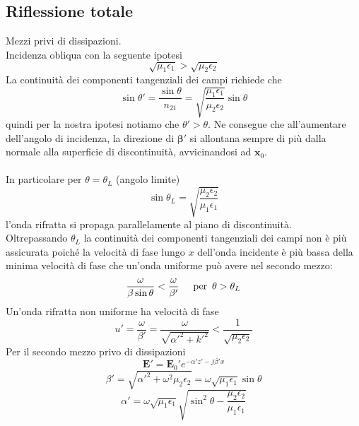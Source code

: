 \documentclass[a4paper]{article}
\begin{document}
\subsection*{Riflessione totale}
Mezzi privi di dissipazioni.\\
Incidenza obliqua con la seguente ipotesi
\begin{equation*}
\sqrt{\mu_1\epsilon_1}>\sqrt{\mu_2\epsilon_2}
\end{equation*}
La continuità dei componenti tangenziali dei campi richiede che
\begin{equation*}
\sin\theta'=\frac{\sin\theta}{n_{21}}=\sqrt{\frac{\mu_1\epsilon_1}{\mu_2\epsilon_2}}\sin\theta
\end{equation*}
quindi per la nostra ipotesi notiamo che $\theta'>\theta$.
Ne consegue che all'aumentare dell'angolo di incidenza, la direzione di $\bm{\beta}'$ si allontana sempre di più dalla normale alla superficie di discontinuità, avvicinandosi ad $\textbf{x}_0$.\\\\
In particolare per $\theta=\theta_L$ (angolo limite)
\begin{equation*}
\sin\theta_L=\sqrt{\frac{\mu_2\epsilon_2}{\mu_1\epsilon_1}}
\end{equation*}
l'onda rifratta si propaga parallelamente al piano di discontinuità.\\
Oltrepassando $\theta_L$ la continuità dei componenti tangenziali dei campi non è più assicurata poiché la velocità di fase lungo $x$ dell'onda incidente è più bassa della minima velocità di fase che un'onda uniforme può avere nel secondo mezzo:
\begin{equation*}
\frac{\omega}{\beta\sin\theta}<\frac{\omega}{\beta'}\hspace{5mm}\text{per }\,\theta>\theta_L
\end{equation*}
Un'onda rifratta non uniforme ha velocità di fase
\begin{equation*}
u'=\frac{\omega}{\beta'}=\frac{\omega}{\sqrt{\alpha'^2+k'^2}}<\frac{1}{\sqrt{\mu_2\epsilon_2}}
\end{equation*}
Per il secondo mezzo privo di dissipazioni
\begin{equation*}
\textbf{E}'=\textbf{E}_0'e^{-\alpha'z'-j\beta'x}
\end{equation*}
\begin{equation*}
\beta'=\sqrt{\alpha'^2+\omega^2\mu_2\epsilon_2}=\omega\sqrt{\mu_1\epsilon_1}\sin\theta
\end{equation*}
\begin{equation*}
\alpha'=\omega\sqrt{\mu_1\epsilon_1}\sqrt{\sin^2\theta-\frac{\mu_2\epsilon_2}{\mu_1\epsilon_1}}
\end{equation*}
\end{document}
